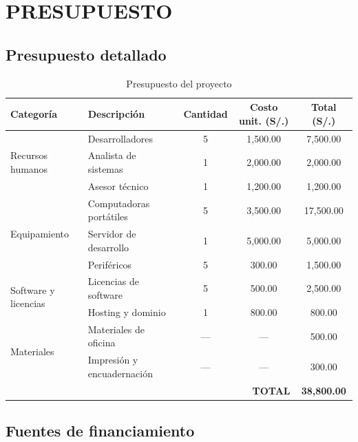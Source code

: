 \newpage
\chapter{PRESUPUESTO}

\section{Presupuesto detallado}

\begin{table}[H]
    \centering
    \caption{Presupuesto del proyecto}
    \small
    \begin{tabular}{|l|l|c|c|c|}
        \hline
        \textbf{Categoría} & \textbf{Descripción} & \textbf{Cantidad} & \textbf{Costo unit. (S/.)} & \textbf{Total (S/.)} \\
        \hline
        \multirow{3}{*}{Recursos humanos}
            & Desarrolladores & 5 & 1{,}500.00 & 7{,}500.00 \\
            & Analista de sistemas & 1 & 2{,}000.00 & 2{,}000.00 \\
            & Asesor técnico & 1 & 1{,}200.00 & 1{,}200.00 \\
        \hline
        \multirow{3}{*}{Equipamiento}
            & Computadoras portátiles & 5 & 3{,}500.00 & 17{,}500.00 \\
            & Servidor de desarrollo & 1 & 5{,}000.00 & 5{,}000.00 \\
            & Periféricos & 5 & 300.00 & 1{,}500.00 \\
        \hline
        \multirow{2}{*}{Software y licencias}
            & Licencias de software & 5 & 500.00 & 2{,}500.00 \\
            & Hosting y dominio & 1 & 800.00 & 800.00 \\
        \hline
        \multirow{2}{*}{Materiales}
            & Materiales de oficina & --- & --- & 500.00 \\
            & Impresión y encuadernación & --- & --- & 300.00 \\
        \hline
        \multicolumn{4}{|r|}{\textbf{TOTAL}} & \textbf{38{,}800.00} \\
        \hline
    \end{tabular}
    \normalsize
\end{table}

\section{Fuentes de financiamiento}

